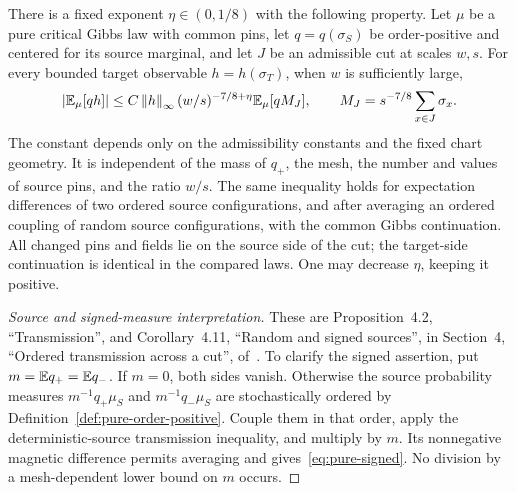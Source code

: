 \begin{proposition}
\label{prop:signed-transmission}
There is a fixed exponent \(\eta\in(0,1/8)\) with the following
property. Let \(\mu\) be a pure critical Gibbs law with common pins,
let \(q=q(\sigma_S)\) be order-positive and centered for its source
marginal, and let \(J\) be an admissible cut at scales \(w,s\).
For every bounded target observable \(h=h(\sigma_T)\), when \(w\) is
sufficiently large,
\begin{equation}
 \left|\mathbb E_\mu[qh]\right|
 \le C\left\|h\right\|_\infty (w/s)^{-7/8+\eta}
               \mathbb E_\mu[qM_J],
 \qquad M_J=s^{-7/8}\sum_{x\in J}\sigma_x.
 \label{eq:pure-signed}
\end{equation}
The constant depends only on the admissibility constants and the fixed
chart geometry. It is independent of the mass of \(q_+\), the mesh,
the number and values of source pins, and the ratio \(w/s\).
The same inequality holds for expectation differences of two ordered
source configurations, and after averaging an ordered coupling of
random source configurations, with the common Gibbs continuation.
All changed pins and fields lie on the source side of the cut; the
target-side continuation is identical in the compared laws.
One may decrease \(\eta\), keeping it positive.
\end{proposition}

\begin{proof}[Source and signed-measure interpretation]
These are Proposition~4.2, ``Transmission'', and Corollary~4.11,
``Random and signed sources'', in Section~4, ``Ordered transmission
across a cut'',
of~\cite{OpenAIStatic2026}. To clarify the signed assertion,
put \(m=\mathbb E q_+=\mathbb E q_-\). If \(m=0\), both sides vanish. Otherwise
the source probability measures \(m^{-1}q_+\mu_S\) and
\(m^{-1}q_-\mu_S\) are stochastically ordered by
Definition~\ref{def:pure-order-positive}. Couple them in that order,
apply the deterministic-source transmission inequality, and multiply
by \(m\). Its nonnegative magnetic difference permits averaging and
gives~\eqref{eq:pure-signed}. No division by a mesh-dependent lower
bound on \(m\) occurs.
\end{proof}


